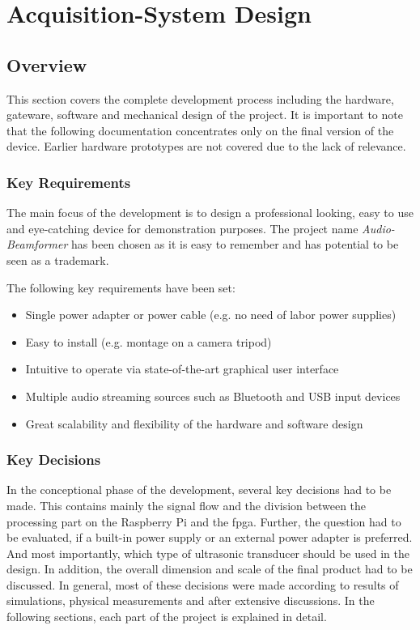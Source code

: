 \chapter{Acquisition-System Design}
\section{Overview}
This section covers the complete development process including the hardware, gateware, software and mechanical design of the project.
It is important to note that the following documentation concentrates only on the final version of the device. Earlier hardware prototypes are not covered due to the lack of relevance.

\subsection{Key Requirements}
The main focus of the development is to design a professional looking, easy to use and eye-catching device for demonstration purposes.
The project name \textit{Audio-Beamformer} has been chosen as it is easy to remember and has potential to be seen as a trademark.

The following key requirements have been set:
\begin{itemize}
	\item Single power adapter or power cable (e.g. no need of labor power supplies)
	\item Easy to install (e.g. montage on a camera tripod)
	\item Intuitive to operate via state-of-the-art graphical user interface
	\item Multiple audio streaming sources such as Bluetooth and USB input devices
	\item Great scalability and flexibility of the hardware and software design
\end{itemize}

\subsection{Key Decisions}
In the conceptional phase of the development, several key decisions had to be made.
This contains mainly the signal flow and the division between the processing part on the Raspberry Pi and the \acrshort{fpga}.
Further, the question had to be evaluated, if a built-in power supply or an external power adapter is preferred.
And most importantly, which type of ultrasonic transducer should be used in the design.
In addition, the overall dimension and scale of the final product had to be discussed.
In general, most of these decisions were made according to results of simulations, physical measurements and after extensive discussions.
In the following sections, each part of the project is explained in detail.


